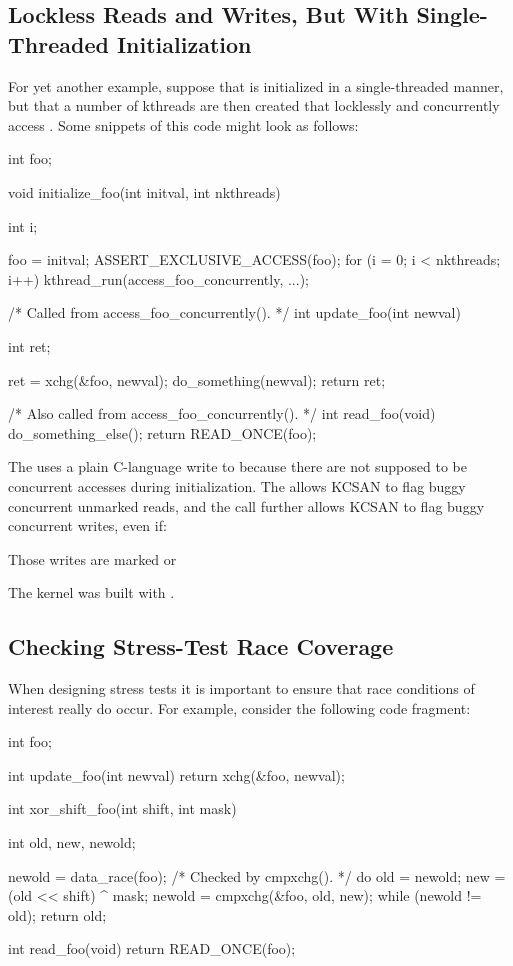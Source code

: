 \subsection{Lockless Reads and Writes, But With Single-Threaded Initialization}

For yet another example, suppose that  is initialized in a
single-threaded manner, but that a number of kthreads are then created
that locklessly and concurrently access .
Some snippets of this code might look as follows:

\begin{VerbatimU}
	int foo;

	void initialize_foo(int initval, int nkthreads)
	{
		int i;

		foo = initval;
		ASSERT_EXCLUSIVE_ACCESS(foo);
		for (i = 0; i < nkthreads; i++)
			kthread_run(access_foo_concurrently, ...);
	}

	/* Called from access_foo_concurrently(). */
	int update_foo(int newval)
	{
		int ret;

		ret = xchg(&foo, newval);
		do_something(newval);
		return ret;
	}

	/* Also called from access_foo_concurrently(). */
	int read_foo(void)
	{
		do_something_else();
		return READ_ONCE(foo);
	}
\end{VerbatimU}

The  uses a plain C-language write to  because there
are not supposed to be concurrent accesses during initialization.
The  allows KCSAN to flag buggy concurrent unmarked
reads, and the  call further allows KCSAN to
flag buggy concurrent writes, even if:
\begin{enumerate*}
\item Those writes are marked or
\item The kernel was built with .
\end{enumerate*}

\subsection{Checking Stress-Test Race Coverage}

When designing stress tests it is important to ensure that race conditions
of interest really do occur.
For example, consider the following code fragment:

\begin{VerbatimU}
	int foo;

	int update_foo(int newval)
	{
		return xchg(&foo, newval);
	}

	int xor_shift_foo(int shift, int mask)
	{
		int old, new, newold;

		newold = data_race(foo); /* Checked by cmpxchg(). */
		do {
			old = newold;
			new = (old << shift) ^ mask;
			newold = cmpxchg(&foo, old, new);
		} while (newold != old);
		return old;
	}

	int read_foo(void)
	{
		return READ_ONCE(foo);
	}
\end{VerbatimU}

